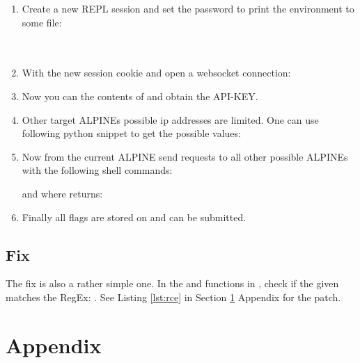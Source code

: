 \documentclass[10pt]{article}
\begin{document}
\begin{enumerate}
	\item Create a new REPL session and set the password to print the environment to some file: \\
	       \\
	       \\
	\item With the new session cookie and  open a websocket connection: \\
	\item Now you can  the contents of  and obtain the API-KEY.
	\item Other target ALPINEs possible ip addresses are limited. One can use following python snippet to get the possible values: \\
	      
	\item Now from the current ALPINE send requests to all other possible ALPINEs with the following shell commands:
	      
	      and where  returns:
	      
	\item Finally all flags are stored on  and can be submitted.

\end{enumerate}

\subsection{Fix}

The fix is also a rather simple one. In the  and  functions in , check if the given  matches the RegEx: \robotomonoRegular{\^{}[a-zA-Z0-9]*\$}. See Listing \ref{lst:rce} in Section \ref{sec:appendix} Appendix for the patch.

\newpage
\section{Appendix}
\label{sec:appendix}


\newpage


\newpage


\end{document}
